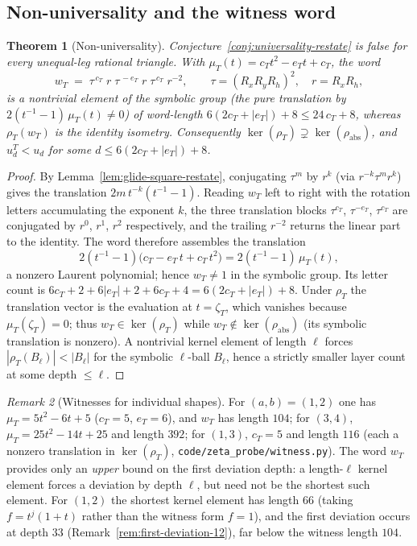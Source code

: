 \documentclass[11pt]{article}
\theoremstyle{plain}
\newtheorem{theorem}{Theorem}
\theoremstyle{definition}
\theoremstyle{remark}
\newtheorem{remark}[theorem]{Remark}
\begin{document}
\subsection{Non-universality and the witness word}

\begin{theorem}[Non-universality]
\label{thm:non-universality-restate}
Conjecture~\ref{conj:universality-restate} is false for every
unequal-leg rational triangle. With $\mu_T(t) = c_T t^2 - e_T t + c_T$,
the word
\[
w_T \;=\; \tau^{\,c_T}\; r\; \tau^{\,-e_T}\; r\;
\tau^{\,c_T}\; r^{-2},
\qquad \tau = (R_x R_y R_h)^2, \quad r = R_x R_h,
\]
is a nontrivial element of the symbolic group (the pure translation
by $2(t^{-1}-1)\,\mu_T(t) \neq 0$) of word-length
$6(2c_T + |e_T|) + 8 \le 24\,c_T + 8$, whereas $\rho_T(w_T)$ is the
identity isometry. Consequently
$\ker(\rho_T) \supsetneq \ker(\rho_{\mathrm{abs}})$, and $u_d^T < u_d$
for some $d \le 6(2c_T + |e_T|) + 8$.
\end{theorem}

\begin{proof}
By Lemma~\ref{lem:glide-square-restate}, conjugating $\tau^m$ by $r^{k}$
(via $r^{-k}\tau^m r^{k}$) gives the translation $2m\,t^{-k}(t^{-1}-1)$.
Reading $w_T$ left to right with the rotation letters accumulating the
exponent $k$, the three translation blocks $\tau^{c_T}$, $\tau^{-e_T}$,
$\tau^{c_T}$ are conjugated by $r^{0}$, $r^{1}$, $r^{2}$ respectively,
and the trailing $r^{-2}$ returns the linear part to the identity. The
word therefore assembles the translation
\[
2(t^{-1}-1)\bigl(c_T - e_T\,t + c_T\,t^2\bigr)
= 2(t^{-1}-1)\,\mu_T(t),
\]
a nonzero Laurent polynomial; hence $w_T \neq 1$ in the symbolic group.
Its letter count is $6c_T + 2 + 6|e_T| + 2 + 6c_T + 4 = 6(2c_T+|e_T|)+8$.
Under $\rho_T$ the translation vector is the evaluation at $t = \zeta_T$,
which vanishes because $\mu_T(\zeta_T) = 0$; thus $w_T \in \ker(\rho_T)$
while $w_T \notin \ker(\rho_{\mathrm{abs}})$ (its symbolic translation is
nonzero). A nontrivial kernel element of length $\ell$ forces
$|\rho_T(B_\ell)| < |B_\ell|$ for the symbolic $\ell$-ball $B_\ell$,
hence a strictly smaller layer count at some depth $\le \ell$.
\end{proof}

\begin{remark}[Witnesses for individual shapes]
\label{rem:witness-instances}
For $(a,b) = (1,2)$ one has $\mu_T = 5t^2 - 6t + 5$
($c_T = 5$, $e_T = 6$), and $w_T$ has length $104$; for $(3,4)$,
$\mu_T = 25t^2 - 14t + 25$ and length $392$; for $(1,3)$, $c_T = 5$ and
length $116$ (each a nonzero translation in $\ker(\rho_T)$,
\texttt{code/zeta\_probe/witness.py}). The word $w_T$ provides only an
\emph{upper} bound on the first deviation depth: a length-$\ell$ kernel
element forces a deviation by depth $\ell$, but need not be the shortest
such element. For $(1,2)$ the shortest kernel element has length $66$
(taking $f = t^j(1+t)$ rather than the witness form $f = 1$), and the
first deviation occurs at depth $33$
(Remark~\ref{rem:first-deviation-12}), far below the witness length
$104$.
\end{remark}
\end{document}
